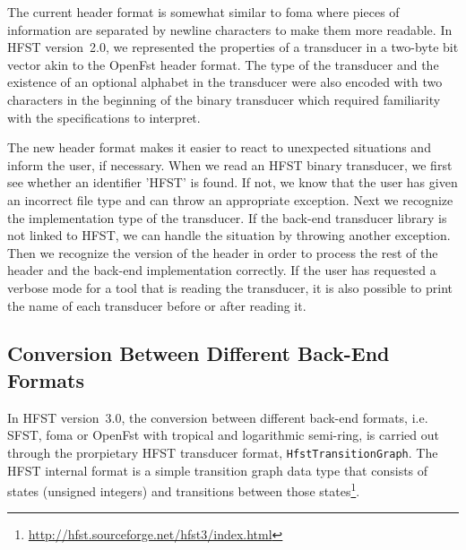 \documentclass{llncs}
\begin{document}
The current header format is somewhat similar to foma where pieces of 
information are separated by newline characters to make them more
readable. In HFST version~2.0, we represented the properties of a
transducer in a two-byte bit vector akin to the OpenFst header
format. The type of the transducer and the existence of an optional
alphabet in the transducer were also encoded with two characters in the beginning of the
binary transducer which required familiarity with the specifications to interpret.


The new header format makes it easier to react to unexpected
situations and inform the user, if necessary. When we read an HFST
binary transducer, we first see whether an identifier 'HFST' is
found. If not, we know that the user has given an incorrect
file type and can throw an appropriate exception. 
Next we recognize the implementation type of the transducer. 
If the back-end transducer library is not linked to HFST, we can handle
the situation by throwing another exception. 
Then we recognize the version of the header in order to process 
the rest of the header and the back-end implementation correctly. 
If the user has requested a verbose mode for a tool that is reading the
transducer, it is also possible to print the name of each transducer 
before or after reading it.

\subsection{Conversion Between Different Back-End Formats}
In HFST version~3.0, the conversion between different back-end formats, i.e. 
SFST, foma or OpenFst with tropical and logarithmic semi-ring,  is
carried out through the prorpietary HFST transducer format, \texttt{HfstTransitionGraph}. 
The HFST internal format is a simple transition graph data type that consists 
of states (unsigned integers) and transitions between those 
states\footnote{\url{http://hfst.sourceforge.net/hfst3/index.html}}.
 
\end{document}
